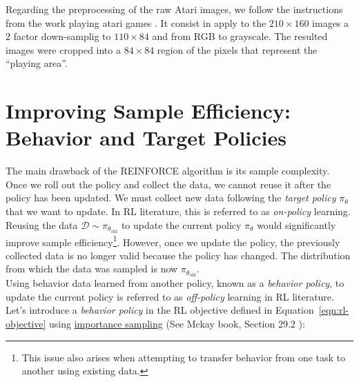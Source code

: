 




\noindent Regarding the preprocessing of the raw Atari images, we follow the instructions
from the work playing atari games \cite{mnih2013playing}. It consist in
apply to the $210\times 160$ images a 2 factor down-samplig to $110\times 84$
and from RGB to grayscale. The resulted images were cropped into a $84\times84$
region of the pixels that represent the ``playing area''.

\section{Improving Sample Efficiency: Behavior and Target Policies}


The main drawback of the REINFORCE algorithm is its sample complexity. Once we roll out the policy and collect the data, we cannot reuse it after the policy has been updated. We must collect new data following the \textit{target policy} $\pi_{\theta}$ that we want to update. In RL literature, this is referred to as \textit{on-policy} learning. Reusing the data $\mathcal{D}\sim\pi_{\theta_{\text{old}}}$ to update the current policy $\pi_{\theta}$ would significantly improve sample efficiency\footnote{This issue also arises when attempting to transfer behavior from one task to another using existing data.}. However, once we update the policy, the previously collected data is no longer valid because the policy has changed. The distribution from which the data was sampled is now $\pi_{\theta_{\text{old}}}$. \\

\noindent Using behavior data learned from another policy, known as a \textit{behavior policy}, to update the current policy is referred to as \textit{off-policy} learning in RL literature. Let's introduce a \textit{behavior policy} in the RL objective defined in Equation~\ref{eqn:rl-objective} using \href{https://timvieira.github.io/blog/post/2014/12/21/importance-sampling/}{importance sampling} (See Mckay book, Section 29.2 \cite{mackay-book}):

